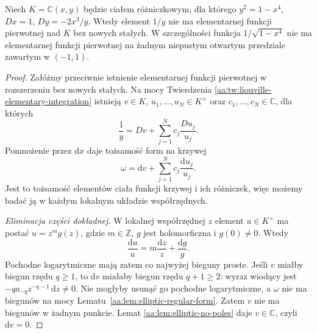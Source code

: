 \begin{twierdzenie}
\label{aa:tw:elliptic-integral-nonelementary}
Niech $K=\mathbb C(x,y)$ będzie
ciałem różniczkowym, dla którego
$y^2=1-x^4$, $Dx=1$,
$Dy=-2x^3/y$. Wtedy element
$1/y$ nie ma elementarnej
funkcji pierwotnej nad $K$
bez nowych stałych.
W szczególności funkcja
$1/\sqrt{1-x^4}$ nie ma
elementarnej funkcji pierwotnej
na żadnym niepustym otwartym
przedziale zawartym w $(-1,1)$.
\end{twierdzenie}
\begin{proof}
Załóżmy przeciwnie istnienie
elementarnej funkcji pierwotnej
w rozszerzeniu bez nowych stałych.
Na mocy Twierdzenia
\ref{aa:tw:liouville-elementary-integration}
istnieją $v\in K$,
$u_1,\ldots,u_N\in K^\times$
oraz $c_1,\ldots,c_N\in\mathbb C$,
dla których
\[
 \frac1y=Dv+\sum_{j=1}^Nc_j\frac{Du_j}{u_j}.
\]
Pomnożenie przez $\mathrm dx$
daje tożsamość form na krzywej
\begin{equation}\label{aa:eq:elliptic-liouville-form}
 \omega=\mathrm dv+
       \sum_{j=1}^Nc_j\frac{\mathrm du_j}{u_j}.
\end{equation}
\begingroup
\makeatletter
\protected@edef\@currentlabel{\p@equation\theequation}
\ifdefined\theHequation
  \edef\@currentHref{equation.\theHequation}
\fi
\label{eq:elliptic-liouville}
\makeatother
\endgroup
Jest to tożsamość elementów
ciała funkcji krzywej
i ich różniczek, więc
możemy badać ją w każdym
lokalnym układzie współrzędnych.

\emph{Eliminacja części dokładnej.}
W lokalnej współrzędnej $z$
element $u\in K^\times$ ma
postać $u=z^m g(z)$,
gdzie $m\in\mathbb Z$,
$g$ jest holomorficzna
i $g(0)\ne0$.
Wtedy
\[
 \frac{\mathrm du}{u}
 =m\frac{\mathrm dz}{z}
   +\frac{\mathrm dg}{g}.
\]
Pochodne logarytmiczne
mają zatem co najwyżej
bieguny proste.
Jeśli $v$ miałby
biegun rzędu $q\ge1$,
to $\mathrm dv$
miałaby biegun rzędu
$q+1\ge2$:
wyraz wiodący jest
$-q a_{-q}z^{-q-1}\,\mathrm dz\ne0$.
Nie mogłyby usunąć go
pochodne logarytmiczne,
a $\omega$ nie ma biegunów
na mocy
Lematu~\ref{aa:lem:elliptic-regular-form}.
Zatem $v$ nie ma biegunów
w żadnym punkcie. Lemat
\ref{aa:lem:elliptic-no-poles}
daje $v\in\mathbb C$,
czyli $\mathrm dv=0$.


\end{proof}
